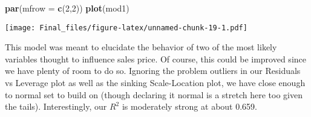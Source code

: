\documentclass[
]{article}
\newenvironment{Shaded}{\begin{snugshade}}{\end{snugshade}}
\newcommand{\DataTypeTok}[1]{\textcolor[rgb]{0.13,0.29,0.53}{#1}}
\newcommand{\DecValTok}[1]{\textcolor[rgb]{0.00,0.00,0.81}{#1}}
\newcommand{\KeywordTok}[1]{\textcolor[rgb]{0.13,0.29,0.53}{\textbf{#1}}}
\newcommand{\NormalTok}[1]{#1}
\begin{document}
\begin{Shaded}
\begin{Highlighting}[]
\KeywordTok{par}\NormalTok{(}\DataTypeTok{mfrow =} \KeywordTok{c}\NormalTok{(}\DecValTok{2}\NormalTok{,}\DecValTok{2}\NormalTok{))}
\KeywordTok{plot}\NormalTok{(mod1)}
\end{Highlighting}
\end{Shaded}

\texttt{[image: Final\_files/figure-latex/unnamed-chunk-19-1.pdf]}

This model was meant to elucidate the behavior of two of the most likely
variables thought to influence sales price. Of course, this could be
improved since we have plenty of room to do so. Ignoring the problem
outliers in our Residuals vs Leverage plot as well as the sinking
Scale-Location plot, we have close enough to normal set to build on
(though declaring it normal is a stretch here too given the tails).
Interestingly, our \(R^2\) is moderately strong at about 0.659.
\end{document}
